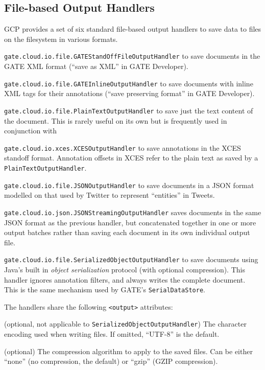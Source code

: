 \subsection{File-based Output Handlers}\label{sec:batch-def:file-output-handlers}

GCP provides a set of six standard file-based output handlers to save data to
files on the filesystem in various formats.

\bit
\item \verb!gate.cloud.io.file.GATEStandOffFileOutputHandler! to save documents
  in the GATE XML format (``save as XML'' in GATE Developer).
\item \verb!gate.cloud.io.file.GATEInlineOutputHandler! to save documents with
  inline XML tags for their annotations (``save preserving format'' in GATE
  Developer).
\item \verb!gate.cloud.io.file.PlainTextOutputHandler! to save just the text
  content of the document.  This is rarely useful on its own but is frequently
  used in conjunction with
\item \verb!gate.cloud.io.xces.XCESOutputHandler! to save annotations in the
  XCES standoff format.  Annotation offsets in XCES refer to the plain text as
  saved by a \verb!PlainTextOutputHandler!.
\item \verb!gate.cloud.io.file.JSONOutputHandler! to save documents in a JSON
  format modelled on that used by Twitter to represent ``entities'' in Tweets.
\item \verb!gate.cloud.io.json.JSONStreamingOutputHandler! saves documents in
  the same JSON format as the previous handler, but concatenated together in
  one or more output batches rather than saving each document in its own
  individual output file.
\item \verb!gate.cloud.io.file.SerializedObjectOutputHandler! to save documents
  using Java's built in \emph{object serialization} protocol (with optional
  compression).  This handler ignores annotation filters, and always writes
  the complete document.  This is the same mechanism used by GATE's
  \verb!SerialDataStore!.
\eit

The handlers share the following \verb!<output>! attributes:

\bde
\item[encoding] (optional, not applicable to
  \verb!SerializedObjectOutputHandler!) The character encoding used when
  writing files.  If omitted, ``UTF-8'' is the default.
\item[compression] (optional) The compression algorithm to apply to the saved
  files.  Can be either ``none'' (no compression, the default) or ``gzip''
  (GZIP compression).
\ede

